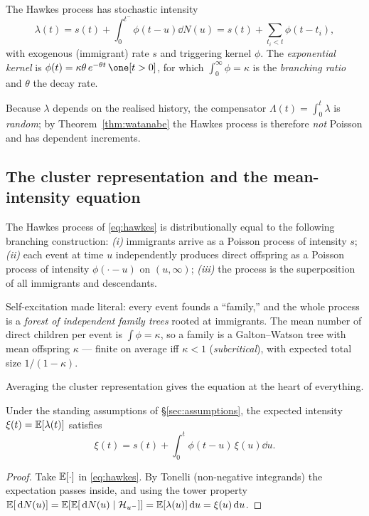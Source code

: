 \begin{model}\label{mod:hawkes}
The Hawkes process has stochastic intensity
\begin{equation}
\lambda(t)=s(t)+\int_0^{t^-}\!\phi(t-u)\dd N(u)
=s(t)+\sum_{t_i<t}\phi(t-t_i),
\label{eq:hawkes}
\end{equation}
with exogenous (immigrant) rate $s$ and triggering kernel $\phi$. The
\emph{exponential kernel} is $\phi(t)=\kappa\theta\,e^{-\theta t}\,\one[t>0]$, for
which $\int_0^\infty\phi=\kappa$ is the \emph{branching ratio} and $\theta$ the
decay rate.
\end{model}

Because $\lambda$ depends on the realised history, the compensator
$\Lambda(t)=\int_0^t\lambda$ is \emph{random}; by Theorem~\ref{thm:watanabe} the
Hawkes process is therefore \emph{not} Poisson and has dependent increments.

\subsection{The cluster representation and the mean-intensity equation}

\begin{theorem}\label{thm:cluster}
The Hawkes process of \eqref{eq:hawkes} is distributionally equal to the following
branching construction: \emph{(i)} immigrants arrive as a Poisson process of
intensity $s$; \emph{(ii)} each event at time $u$ independently produces direct
offspring as a Poisson process of intensity $\phi(\cdot-u)$ on $(u,\infty)$;
\emph{(iii)} the process is the superposition of all immigrants and descendants.
\end{theorem}

\begin{intuition}
Self-excitation made literal: every event founds a ``family,'' and the whole
process is a \emph{forest of independent family trees} rooted at immigrants. The
mean number of direct children per event is $\int\phi=\kappa$, so a family is a
Galton--Watson tree with mean offspring $\kappa$ --- finite on average iff
$\kappa<1$ (\emph{subcritical}), with expected total size $1/(1-\kappa)$.
\end{intuition}

Averaging the cluster representation gives the equation at the heart of everything.

\begin{proposition}\label{prop:mbpp-eq}
Under the standing assumptions of \S\ref{sec:assumptions}, the expected intensity
$\xi(t)=\mathbb{E}[\lambda(t)]$ satisfies
\begin{equation}
\xi(t)=s(t)+\int_0^t\phi(t-u)\,\xi(u)\dd u .
\label{eq:mbpp}
\end{equation}
\end{proposition}
\begin{proof}
Take $\mathbb{E}[\cdot]$ in \eqref{eq:hawkes}. By Tonelli (non-negative integrands) the
expectation passes inside, and using the tower property
$\mathbb{E}[\,\mathrm{d} N(u)]=\mathbb{E}[\mathbb{E}[\,\mathrm{d} N(u)\mid\mathcal{H}_{u^-}]]=\mathbb{E}[\lambda(u)]\,\mathrm{d} u=\xi(u)\,\mathrm{d} u$.
\end{proof}

